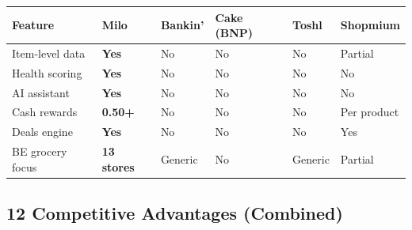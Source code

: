 \documentclass[11pt,a4paper]{article}
\begin{document}
\begin{center}
\renewcommand{\arraystretch}{1.3}
\begin{tabularx}{\textwidth}{L{3cm} C{1.8cm} C{1.8cm} C{2cm} C{1.8cm} C{1.8cm}}
\toprule
{}
\textbf{\color{white}Feature} & \textbf{\color{white}Milo} & \textbf{\color{white}Bankin'} & \textbf{\color{white}Cake (BNP)} & \textbf{\color{white}Toshl} & \textbf{\color{white}Shopmium} \\
\midrule
Item-level data & \textbf{\color{milogreen}Yes} & \textcolor{milored}{No} & \textcolor{milored}{No} & \textcolor{milored}{No} & Partial \\
Health scoring & \textbf{\color{milogreen}Yes} & \textcolor{milored}{No} & \textcolor{milored}{No} & \textcolor{milored}{No} & \textcolor{milored}{No} \\
AI assistant & \textbf{\color{milogreen}Yes} & \textcolor{milored}{No} & \textcolor{milored}{No} & \textcolor{milored}{No} & \textcolor{milored}{No} \\
Cash rewards & \textbf{\color{milogreen}\texteuro{}0.50+} & \textcolor{milored}{No} & \textcolor{milored}{No} & \textcolor{milored}{No} & Per product \\
Deals engine & \textbf{\color{milogreen}Yes} & \textcolor{milored}{No} & \textcolor{milored}{No} & \textcolor{milored}{No} & Yes \\
BE grocery focus & \textbf{\color{milogreen}13 stores} & Generic & \textcolor{milored}{No} & Generic & Partial \\
\bottomrule
\end{tabularx}
\end{center}

\subsection{12 Competitive Advantages (Combined)}
\end{document}
